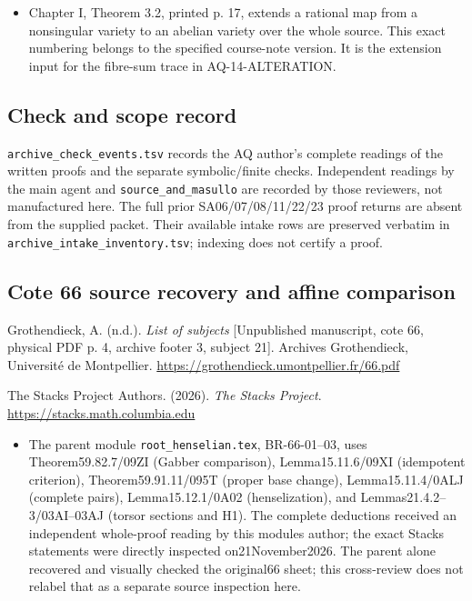 \documentclass[11pt,a4paper]{article}
\providecommand{\tightlist}{\setlength{\itemsep}{0pt}\setlength{\parskip}{0pt}}
\theoremstyle{definition}\newtheorem{definition}[theorem]{Definition}
\theoremstyle{remark}\newtheorem{remark}[theorem]{Remark}
\begin{document}
\begin{itemize}
\tightlist
\item
  Chapter I, Theorem 3.2, printed p. 17, extends a rational map from a
  nonsingular variety to an abelian variety over the whole source. This
  exact numbering belongs to the specified course-note version. It is
  the extension input for the fibre-sum trace in AQ-14-ALTERATION.
\end{itemize}

\subsection{Check and scope record}\label{check-and-scope-record}

\nolinkurl{archive_check_events.tsv} records the AQ author's complete
readings of the written proofs and the separate symbolic/finite checks.
Independent readings by the main agent and \nolinkurl{source_and_masullo}
are recorded by those reviewers, not manufactured here. The full prior
SA06/07/08/11/22/23 proof returns are absent from the supplied packet.
Their available intake rows are preserved verbatim in
\nolinkurl{archive_intake_inventory.tsv}; indexing does not certify a
proof.

\subsection{Cote 66 source recovery and affine
comparison}\label{cote-66-source-recovery-and-affine-comparison}

Grothendieck, A. (n.d.). \emph{List of subjects} {[}Unpublished
manuscript, cote 66, physical PDF p. 4, archive footer 3, subject 21{]}.
Archives Grothendieck, Université de Montpellier.
\url{https://grothendieck.umontpellier.fr/66.pdf}

The Stacks Project Authors. (2026). \emph{The Stacks Project}.
\url{https://stacks.math.columbia.edu}

\begin{itemize}
\tightlist
\item
  The parent module \nolinkurl{root_henselian.tex}, BR-66-01--03, uses
  Theorem59.82.7/09ZI (Gabber comparison), Lemma15.11.6/09XI (idempotent
  criterion), Theorem59.91.11/095T (proper base change),
  Lemma15.11.4/0ALJ (complete pairs), Lemma15.12.1/0A02 (henselization),
  and Lemmas21.4.2--3/03AI--03AJ (torsor sections and H1). The complete
  deductions received an independent whole-proof reading by this
  module\textquotesingle s author; the exact Stacks statements were
  directly inspected on21November2026. The parent alone recovered and
  visually checked the original66 sheet; this cross-review does not
  relabel that as a separate source inspection here.
\end{itemize}
\end{document}
